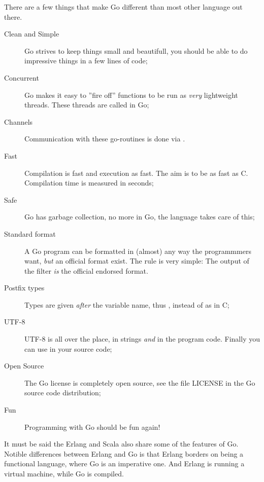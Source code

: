 \noindent{}There are a few things that make Go different than most other language
out there.
\begin{description}
\item[Clean and Simple]
Go strives to keep things small and beautifull, you should
be able to do impressive things in a few lines of code;
\item[Concurrent]
Go makes it easy to ''fire off'' functions to be
run as \emph{very} lightweight threads. These threads are called
 in Go;

\item[Channels] 
Communication with these go-routines is done
via  \cite{csp}.

\item[Fast]
Compilation is fast and execution as fast. The aim is
to be as fast as C. Compilation time is measured in seconds;

\item[Safe]
Go has garbage collection, no more  in Go,
the language takes care of this;

\item[Standard format]
A Go program can be formatted in (almost) any way the programmmers want,
\emph{but} an official format exist. The rule is very simple:
The output of the filter  \emph{is} the official endorsed
format.

\item[Postfix types]
Types are given \emph{after} the variable name, thus ,
instead of  as in C;

\item[UTF-8]
UTF-8 is all over the place, in strings
\emph{and} in the program code. Finally you can use  in your source code;

\item[Open Source]
The Go license is completely open source, see the file LICENSE in the Go
source code distribution;

\item[Fun]
Programming with Go should be fun again!

\end{description}
It must be said the Erlang \cite{erlang} and Scala \cite{scala} also share some
of the features of Go. Notible differences between Erlang
and Go is that Erlang borders on being a functional language,
where Go is an imperative one. And Erlang is running a virtual
machine, while Go is compiled. 


